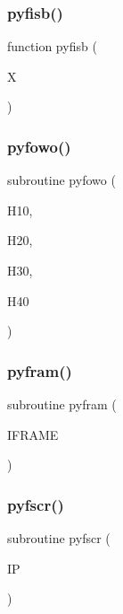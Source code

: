\subsubsection{\texorpdfstring{pyfisb()}{pyfisb()}}
{\footnotesize\ttfamily function pyfisb (\begin{DoxyParamCaption}\item[{}]{X }\end{DoxyParamCaption})}

\mbox{\label{pythia-6_84_824_8f_abf7b5cfdcfaac6f5a57ac9bdfff6e358}} 
\subsubsection{\texorpdfstring{pyfowo()}{pyfowo()}}
{\footnotesize\ttfamily subroutine pyfowo (\begin{DoxyParamCaption}\item[{}]{H10,  }\item[{}]{H20,  }\item[{}]{H30,  }\item[{}]{H40 }\end{DoxyParamCaption})}

\mbox{\label{pythia-6_84_824_8f_a1fa4f66dad94f52bee42aa351c5af69e}} 
\subsubsection{\texorpdfstring{pyfram()}{pyfram()}}
{\footnotesize\ttfamily subroutine pyfram (\begin{DoxyParamCaption}\item[{}]{I\+F\+R\+A\+ME }\end{DoxyParamCaption})}

\mbox{\label{pythia-6_84_824_8f_a53aee4d056754e39818570985bc7167d}} 
\subsubsection{\texorpdfstring{pyfscr()}{pyfscr()}}
{\footnotesize\ttfamily subroutine pyfscr (\begin{DoxyParamCaption}\item[{}]{IP }\end{DoxyParamCaption})}

